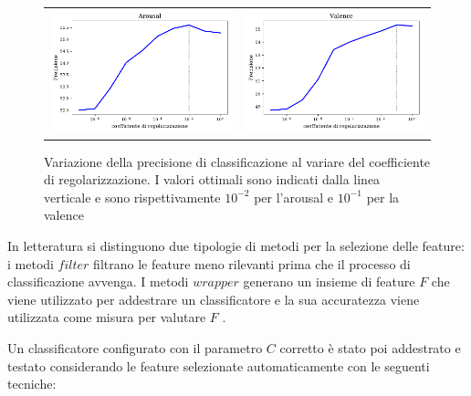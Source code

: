 \begin{figure}
\begin{tabular}{cc}
 \includegraphics[width=.45\textwidth]{img/reg_coef_aro.pdf} & \includegraphics[width=.45\textwidth]{img/reg_coef_val.pdf}
\end{tabular}
\caption{Variazione della precisione di classificazione al variare del coefficiente di regolarizzazione. I valori ottimali sono indicati dalla linea verticale e sono rispettivamente $10^{-2}$ per l'arousal e $10^{-1}$ per la valence}
\label{img:regolarization_test}
\end{figure}

In letteratura si distinguono due tipologie di metodi per la selezione delle feature: i metodi $filter$ filtrano le feature meno rilevanti prima che il processo di classificazione avvenga. I metodi $wrapper$ generano un insieme di feature $F$ che viene utilizzato per addestrare un classificatore e la sua accuratezza viene utilizzata come misura per valutare $F$ \cite{langley1994selection}.

Un classificatore configurato con il parametro $C$ corretto è stato poi addestrato e testato considerando le feature selezionate automaticamente con le seguenti tecniche:

